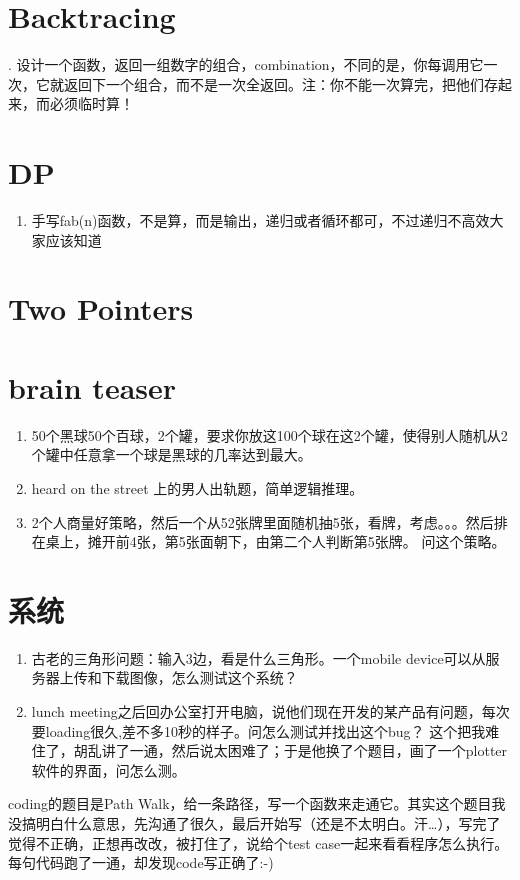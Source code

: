 \documentclass[12pt]{book}
\begin{document}
\chapter{Backtracing}
\label{sec-13}
. 设计一个函数，返回一组数字的组合，combination，不同的是，你每调用它一次，它就返回下一个组合，而不是一次全返回。注：你不能一次算完，把他们存起来，而必须临时算！

\chapter{DP}
\label{sec-14}
\begin{enumerate}
\item 手写fab(n)函数，不是算，而是输出，递归或者循环都可，不过递归不高效大家应该知道
\end{enumerate}

\chapter{Two Pointers}
\label{sec-15}

\chapter{brain teaser}
\label{sec-16}
\begin{enumerate}
\item 50个黑球50个百球，2个罐，要求你放这100个球在这2个罐，使得别人随机从2个罐中任意拿一个球是黑球的几率达到最大。

\item heard on the street 上的男人出轨题，简单逻辑推理。

\item 2个人商量好策略，然后一个从52张牌里面随机抽5张，看牌，考虑。。。然后排在桌上，摊开前4张，第5张面朝下，由第二个人判断第5张牌。 问这个策略。
\end{enumerate}

\chapter{系统}
\label{sec-17}
\begin{enumerate}
\item 古老的三角形问题：输入3边，看是什么三角形。一个mobile device可以从服务器上传和下载图像，怎么测试这个系统？

\item lunch meeting之后回办公室打开电脑，说他们现在开发的某产品有问题，每次要loading很久,差不多10秒的样子。问怎么测试并找出这个bug？ 这个把我难住了，胡乱讲了一通，然后说太困难了；于是他换了个题目，画了一个plotter软件的界面，问怎么测。
\end{enumerate}
coding的题目是Path Walk，给一条路径，写一个函数来走通它。其实这个题目我没搞明白什么意思，先沟通了很久，最后开始写（还是不太明白。汗\ldots{}），写完了觉得不正确，正想再改改，被打住了，说给个test case一起来看看程序怎么执行。每句代码跑了一通，却发现code写正确了:-) 
\end{document}
